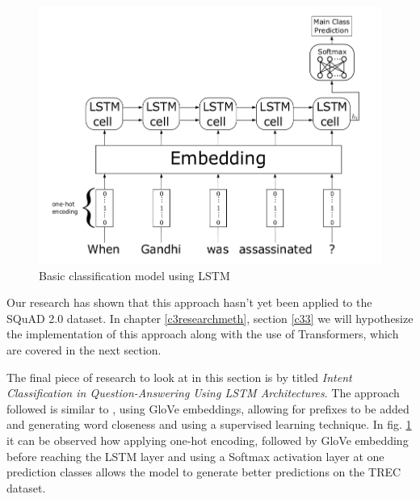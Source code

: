 \documentclass[a4paper,12pt]{report}
\begin{document}
		\begin{figure}[!h]
			\centering
			\includegraphics[scale=0.35]{../images/lstm-intent1.png}
			\caption{Basic classification model using LSTM \citep{lstmintent}}\label{lstmIntent1}
		\end{figure}
	     Our research has shown that this approach hasn't yet been applied to the SQuAD 2.0 dataset. In chapter \ref{c3researchmeth}, section \ref{c33} we will hypothesize the implementation of this approach along with the use of Transformers, which are covered in the next section.

         The final piece of research to look at in this section is by \cite{lstmintent} titled \textit{Intent Classification in Question-Answering Using LSTM Architectures}. The approach followed is similar to \citep{lstmSubilstm}, using GloVe embeddings, allowing for prefixes to be added and generating word closeness and using a supervised learning technique. In fig. \ref{lstmIntent1} it can be observed how applying one-hot encoding, followed by GloVe embedding before reaching the LSTM layer and using a Softmax activation layer at one prediction classes allows the model to generate better predictions on the TREC \citep{trec} dataset.
\end{document}
